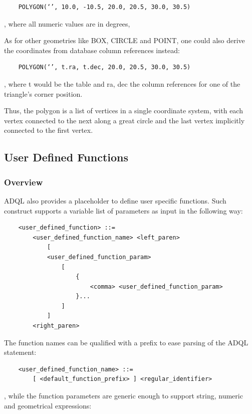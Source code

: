 \documentclass[11pt,a4paper]{ivoa}
\begin{document}
\begin{verbatim}
    POLYGON(‘’, 10.0, -10.5, 20.0, 20.5, 30.0, 30.5)
\end{verbatim}
    
, where all numeric values are in degrees,

As for other geometries like BOX, CIRCLE and POINT, one could also derive
the coordinates from database column references instead:

\begin{verbatim}
    POLYGON(‘’, t.ra, t.dec, 20.0, 20.5, 30.0, 30.5)
\end{verbatim}

, where t would be the table and ra, dec the column references for one of
the triangle’s corner position.

Thus, the polygon is a list of vertices in a single coordinate system, with
each vertex connected to the next along a great circle and the last vertex
implicitly connected to the first vertex.

\subsection{User Defined Functions}
\label{sec:user.functions}
\subsubsection{Overview}

ADQL also provides a placeholder to define user specific functions. Such
construct supports a variable list of parameters as input in the following way:

\begin{verbatim}
    <user_defined_function> ::=
        <user_defined_function_name> <left_paren>
            [
            <user_defined_function_param>
                [
                    {
                        <comma> <user_defined_function_param>
                    }...
                ]
            ]
        <right_paren>
\end{verbatim}

The function names can be qualified with a prefix to ease parsing of the
ADQL statement:

\begin{verbatim}
    <user_defined_function_name> ::=
        [ <default_function_prefix> ] <regular_identifier>
\end{verbatim}

, while the function parameters are generic enough to support string,
numeric and geometrical expressions:
\end{document}
